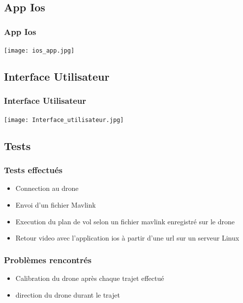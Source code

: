 \documentclass{beamer}
\begin{document}
	
	\begin{frame}
	\section{App Ios}
		\begin{center}
		\frametitle{App Ios}
        \texttt{[image: ios\_app.jpg]}
		\end{center}
	\end{frame}
	
		\begin{frame}
	\section{Interface Utilisateur}
		\begin{center}
		\frametitle{Interface Utilisateur}
        \texttt{[image: Interface\_utilisateur.jpg]}
		\end{center}
	\end{frame}
	
	\begin{frame}
	\section{Tests}
		\begin{center}
		\frametitle{Tests effectués}
           	\begin{itemize}
                \item Connection au drone
                \item Envoi d'un fichier Mavlink
                \item Execution du plan de vol selon un fichier mavlink enregistré sur le drone
                \item Retour video avec l'application ios à partir d'une url sur un serveur Linux
            \end{itemize}
		\end{center}
	\end{frame}
	
		\begin{frame}
		\begin{center}
		\frametitle{Problèmes rencontrés}
             \begin{itemize}
                \item Calibration du drone après chaque trajet effectué
                \item direction du drone durant le trajet
            \end{itemize}
		\end{center}
	\end{frame}
	
\end{document}
